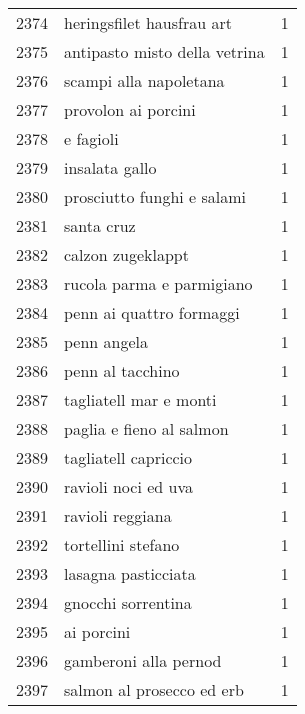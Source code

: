\begin{tabular}{llr}
2374 &                          heringsfilet hausfrau art &      1 \\
2375 &                      antipasto misto della vetrina &      1 \\
2376 &                             scampi alla napoletana &      1 \\
2377 &                                provolon ai porcini &      1 \\
2378 &                                          e fagioli &      1 \\
2379 &                                     insalata gallo &      1 \\
2380 &                         prosciutto funghi e salami &      1 \\
2381 &                                         santa cruz &      1 \\
2382 &                                  calzon zugeklappt &      1 \\
2383 &                          rucola parma e parmigiano &      1 \\
2384 &                           penn ai quattro formaggi &      1 \\
2385 &                                        penn angela &      1 \\
2386 &                                   penn al tacchino &      1 \\
2387 &                             tagliatell mar e monti &      1 \\
2388 &                           paglia e fieno al salmon &      1 \\
2389 &                               tagliatell capriccio &      1 \\
2390 &                                ravioli noci ed uva &      1 \\
2391 &                                   ravioli reggiana &      1 \\
2392 &                                 tortellini stefano &      1 \\
2393 &                                lasagna pasticciata &      1 \\
2394 &                                 gnocchi sorrentina &      1 \\
2395 &                                         ai porcini &      1 \\
2396 &                              gamberoni alla pernod &      1 \\
2397 &                          salmon al prosecco ed erb &      1 \\

\end{tabular}
